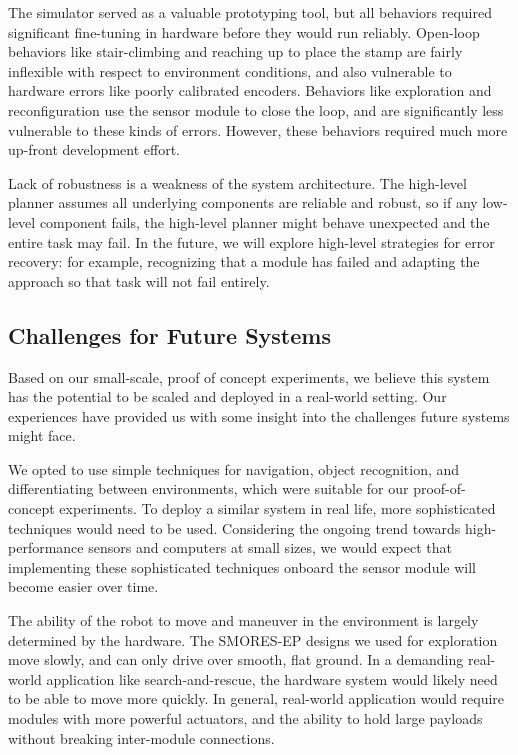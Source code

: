 \documentclass[journal]{IEEEtran}
\newcommand{\TODO}[1]{ {\bf \textcolor{red}{TODO:} #1 }}
\begin{document}
The simulator served as a valuable prototyping tool, but all behaviors required significant
fine-tuning in hardware
before they would run reliably.  
Open-loop behaviors like stair-climbing and reaching up to place the stamp are fairly
inflexible with respect to environment conditions, and also vulnerable to hardware
errors like poorly calibrated encoders.  
Behaviors like exploration and reconfiguration use the sensor module to close the
loop, and are significantly less vulnerable to these kinds of errors.  
However, these behaviors required much more up-front development effort.

Lack of robustness is  a weakness of the system architecture.  The high-level planner assumes all underlying components are reliable and robust, so if any low-level component fails, the high-level planner might behave unexpected and the entire task may fail. In the future, we will explore high-level strategies for error recovery: for example, recognizing that a module has failed and adapting the approach so that task will not fail entirely.
%
\subsection{Challenges for Future Systems}
%
Based on our small-scale, proof of concept experiments, we believe this system has the potential to be scaled and deployed in a real-world setting. Our experiences have provided us with some insight into the challenges future systems might face.

We opted to use simple techniques for navigation, object recognition, and differentiating between environments, which were suitable for our proof-of-concept experiments. To deploy a similar system in real life, more sophisticated techniques would need to be used.  Considering the ongoing trend towards high-performance sensors and computers at small sizes, we would expect that implementing these sophisticated techniques onboard the sensor module will become easier over time.

The ability of the robot to move and maneuver in the environment is largely determined by the hardware.  The SMORES-EP designs we used for exploration move slowly,
 and can only drive over smooth, flat ground.  In a demanding real-world application like search-and-rescue, the hardware system would likely need to be able to move more quickly.  In general, real-world application would require modules with more powerful actuators, and the ability to hold large payloads without breaking inter-module connections.
\end{document}
